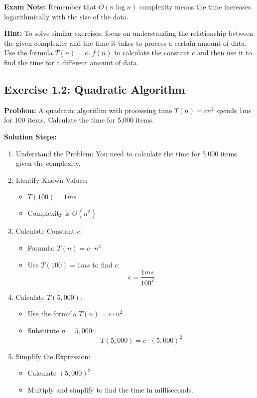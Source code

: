 \textbf{Exam Note:} Remember that $O(n \log n)$ complexity means the time increases logarithmically with the size of the data.

\textbf{Hint:} To solve similar exercises, focus on understanding the relationship between the given complexity and the time it takes to process a certain amount of data. Use the formula $T(n) = c \cdot f(n)$ to calculate the constant $c$ and then use it to find the time for a different amount of data.

\subsection{Exercise 1.2: Quadratic Algorithm}
\textbf{Problem:} A quadratic algorithm with processing time $T(n) = cn^2$ spends 1ms for 100 items. Calculate the time for 5,000 items.

\vspace{0.5em}
\textbf{Solution Steps:}
\begin{enumerate}[leftmargin=*,noitemsep]
    \item Understand the Problem: You need to calculate the time for 5,000 items given the complexity.
    \item Identify Known Values:
    \begin{itemize}
        \item $T(100) = 1ms$
        \item Complexity is $O(n^2)$
    \end{itemize}
    \item Calculate Constant $c$:
    \begin{itemize}
        \item Formula: $T(n) = c \cdot n^2$
        \item Use $T(100) = 1ms$ to find $c$:
        \[ c = \frac{1ms}{100^2} \]
    \end{itemize}
    \item Calculate $T(5,000)$:
    \begin{itemize}
        \item Use the formula $T(n) = c \cdot n^2$
        \item Substitute $n = 5,000$:
        \[ T(5,000) = c \cdot (5,000)^2 \]
    \end{itemize}
    \item Simplify the Expression:
    \begin{itemize}
        \item Calculate $(5,000)^2$
        \item Multiply and simplify to find the time in milliseconds.
    \end{itemize}
\end{enumerate}


